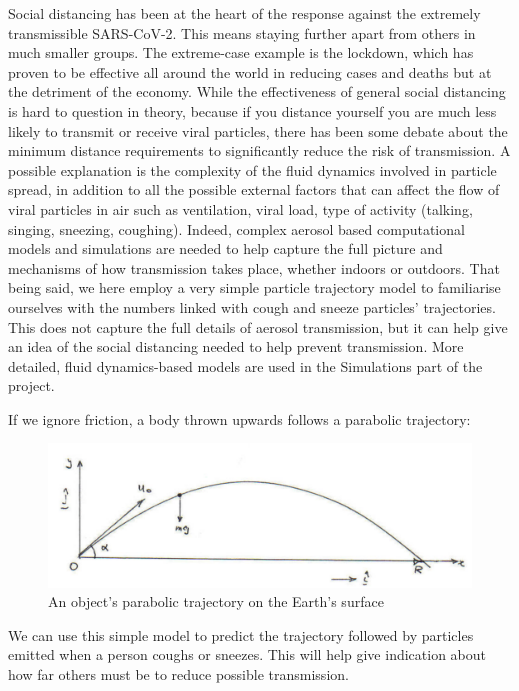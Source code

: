 \documentclass[11pt]{report}
\begin{document}
Social distancing has been at the heart of the response against the extremely transmissible SARS-CoV-2. This means staying further apart from others in much smaller groups. The extreme-case example is the lockdown, which has proven to be effective all around the world in reducing cases and deaths \cite{highly inf countries} \cite{phone data} but at the detriment of the economy. While the effectiveness of general social distancing is hard to question in theory, because if you distance yourself you are much less likely to transmit or receive viral particles, there has been some debate about the minimum distance requirements to significantly reduce the risk of transmission. A possible explanation is the complexity of the fluid dynamics involved in particle spread, in addition to all the possible external factors that can affect the flow of viral particles in air such as ventilation, viral load, type of activity (talking, singing, sneezing, coughing). Indeed, complex aerosol based computational models and simulations are needed to help capture the full picture and mechanisms of how transmission takes place, whether indoors or outdoors.
That being said, we here employ a very simple particle trajectory model to familiarise ourselves with the numbers linked with cough and sneeze particles’ trajectories. This does not capture the full details of aerosol transmission, but it can help give an idea of the social distancing needed to help prevent transmission. More detailed, fluid dynamics-based models are used in the Simulations part of the project. 

If we ignore friction, a body thrown upwards follows a parabolic trajectory:

\begin{figure}[h!]
    \centering
    \includegraphics[width=.8\textwidth,clip]{Parabolic trajectory.png}
    \caption{An object's parabolic trajectory on the Earth's surface}
    
\end{figure}

We can use this simple model to predict the trajectory followed by particles emitted when a person coughs or sneezes. This will help give indication about how far others must be to reduce possible transmission. 
\end{document}
